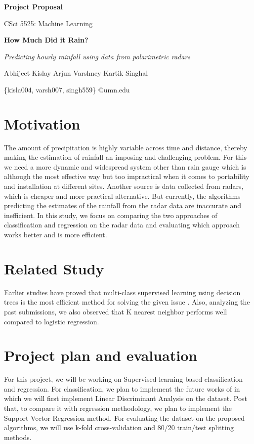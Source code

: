 \documentclass[11pt]{article}
\begin{document}
\thispagestyle{empty}

\bigskip
\centerline{\textbf{\Large{Project Proposal}}}
\centerline{CSci 5525: Machine Learning}

\bigskip
\bigskip

\centerline{\textbf{\Large{How Much Did it Rain?}}}
\centerline{\it{\Large{Predicting hourly rainfall using data from polarimetric radars}}}

\bigskip
\centerline{\Large{Abhijeet Kislay \thickspace Arjun Varshney \thickspace Kartik Singhal }}
\centerline{\{kisla004, varsh007, singh559\} @umn.edu}


\section*{Motivation}
The amount of precipitation is highly variable across time and distance, thereby making the estimation of rainfall an imposing and challenging problem. For this we need a more dynamic and widespread system other than rain gauge which is although the most effective way but too impractical when it comes to portability and installation at different sites. Another source is data collected from radars, which is cheaper and more practical alternative. But currently, the algorithms predicting the estimates of the rainfall from the radar data are inaccurate and inefficient. In this study, we focus on comparing the two approaches of classification and regression on the radar data and evaluating which approach works better and is more efficient.

\section*{Related Study}
Earlier studies have proved that multi-class supervised learning using decision trees is the most efficient method for solving the given issue \cite{anzelmo}. Also, analyzing the past submissions, we also observed that K nearest neighbor performs well compared to logistic regression.\cite{lesnikowski}

\section*{Project plan and evaluation}
For this project, we will be working on Supervised learning based classification and regression. For classification, we plan to implement the future works of \cite{lesnikowski} in which we will first implement Linear Discriminant Analysis on the dataset. Post that, to compare it with regression methodology, we plan to implement the Support Vector Regression method. For evaluating the dataset on the proposed algorithms, we will use k-fold cross-validation and 80/20 train/test splitting methods.
\end{document}
